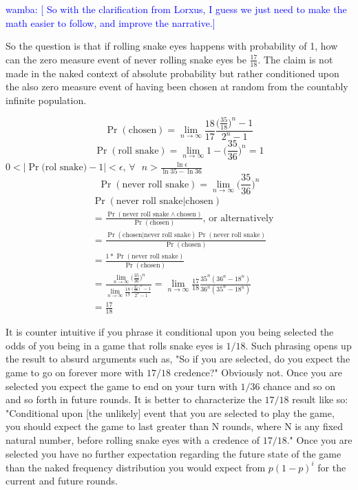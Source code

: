 \documentclass[article,twocolumn]{memoir}
\newcommand{\wamba} [1]{\ifnum\Chatty=1 \textcolor{blue}{wamba:  [#1]} \fi}
\begin{document}
\begin{itemize}
{        \wamba{ So with the clarification from Lorxus, I guess we just need to make the math easier to follow, and improve the narrative.}
        
        So the question is that if rolling snake eyes happens with probability of 1, how can the zero measure event of never rolling snake eyes be $\frac{17}{18}$.  The claim is not made in the naked context of absolute probability but rather conditioned upon the also zero measure event of having been chosen at random from the countably infinite population.

         $$\Pr(\text{chosen})= \lim_{n\to\infty}\frac{18}{17}\frac{\big(\frac{35}{18}\big)^n-1}{2^n-1}$$
         $$\Pr(\text{roll snake})=\underset{n\to\infty}{\lim}1-\bigg(\frac{35}{36}\bigg)^n=1$$
         $0<\bigg|\Pr(\text{rol snake)}-1\bigg|<\epsilon\text{,   }\forall\text{   } n>\frac{\ln{\epsilon}}{\ln{35}-\ln{36}}$
         $$\Pr(\text{never roll snake})=\lim_{n\to\infty}\bigg(\frac{35}{36}\bigg)^n$$
         \begin{align*}
             &\Pr(\text{never roll snake|chosen})\\
             &=\frac{\Pr(\text{never roll snake}\land\text{chosen})}{\Pr(\text{chosen})}\text{, or alternatively}\\
             &=\frac{\Pr(\text{chosen|never roll snake})\Pr(\text{never roll snake})}{\Pr(\text{chosen})}\\
             &=\frac{1 * \Pr(\text{never roll snake})}{\Pr(\text{chosen})}\\
             &=\frac{\lim_{n\to\infty}\bigg(\frac{35}{36}\bigg)^n}{\lim_{n\to\infty}\frac{18}{17}\frac{\big(\frac{35}{18}\big)^n-1}{2^n-1}} = \lim_{n\to\infty}\frac{17}{18}\frac{35^n(36^n-18^n)}{36^n(35^n-18^n)}\\
             &=\frac{17}{18}
         \end{align*}
        
        It is counter intuitive if you phrase it conditional upon you being selected the odds of you being in a game that rolls snake eyes is $1/18$.  Such phrasing opens up the result to absurd arguments such as, "So if you are selected, do you expect the game to go on forever more with $17/18$ credence?"  Obviously not. Once you are selected you expect the game to end on your turn with $1/36$ chance and so on and so forth in future rounds.  It is better to characterize the $17/18$ result like so:  "Conditional upon [the unlikely] event that you are selected to play the game, you should expect the game to last greater than N rounds, where N is any fixed natural number, before rolling snake eyes with a credence of $17/18$."  Once you are selected you have no further expectation regarding the future state of the game than the naked frequency distribution you would expect from $p(1-p)^i$ for the current and future rounds.  

}
\end{itemize}
\end{document}
